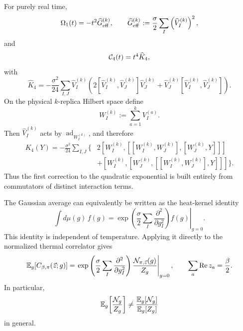 \documentclass{article}
\theoremstyle{definition}
\begin{document}
For purely real time,
\begin{equation}
    \Omega_1(t)=-t^2\widehat G_{\rm eff}^{(k)},
    \qquad
    \widehat G_{\rm eff}^{(k)}
    :=\frac{\sigma}{2}\sum_I\left(\widehat V_I^{(k)}\right)^2,
    \label{eq:quenched_Ghat_eff}
\end{equation}
and
\begin{equation}
    {\cal C}_4(t)=t^4\widehat K_4,
\end{equation}
with
\begin{equation}
    \widehat K_4
    =-\frac{\sigma^2}{24}\sum_{I,J}
    \widehat V_I^{(k)}\left(
        2[\widehat V_I^{(k)},\widehat V_J^{(k)}]\widehat V_J^{(k)}
        +\widehat V_J^{(k)}[\widehat V_I^{(k)},\widehat V_J^{(k)}]
    \right).
    \label{eq:quenched_K4_hatted}
\end{equation}
On the physical $k$-replica Hilbert space define
\begin{equation}
    W_I^{(k)}:=\sum_{a=1}^kV_I^{(a)}.
\end{equation}
Then $\widehat V_I^{(k)}$ acts by $\operatorname{ad}_{W_I^{(k)}}$, and therefore
\begin{align}
    K_4(Y)
    =-\frac{\sigma^2}{24}\sum_{I,J}\Big\{&
        2[W_I^{(k)},[[W_I^{(k)},W_J^{(k)}],[W_J^{(k)},Y]]]
    \nonumber\\
    &+[W_I^{(k)},[W_J^{(k)},[[W_I^{(k)},W_J^{(k)}],Y]]]
    \Big\}.
    \label{eq:quenched_K4_action}
\end{align}
Thus the first correction to the quadratic exponential is built entirely from commutators of distinct interaction terms.

The Gaussian average can equivalently be written as the heat-kernel identity
\begin{equation}
    \int d\mu(g)\,f(g)
    =\left.
    \exp\left(
        \frac{\sigma}{2}\sum_I\frac{\partial^2}{\partial g_I^2}
    \right)f(g)\right|_{g=0}.
    \label{eq:quenched_heat_kernel}
\end{equation}
This identity is independent of temperature. Applying it directly to the normalized thermal correlator gives
\begin{equation}
    \mathbb E_g\!\left[C_{\beta,\pi}(\vec z;g)\right]
    =\left.
    \exp\left(
        \frac{\sigma}{2}\sum_I\frac{\partial^2}{\partial g_I^2}
    \right)
    \frac{{\cal N}_{\pi,\vec z}(g)}{Z_g}
    \right|_{g=0},
    \qquad
    \sum_a\operatorname{Re}z_a=\frac{\beta}{2}.
    \label{eq:quenched_exact_thermal_average}
\end{equation}
In particular,
\begin{equation}
    \mathbb E_g\!\left[\frac{{\cal N}_g}{Z_g}\right]
    \neq
    \frac{\mathbb E_g[\mathcal N_g]}{\mathbb E_g[Z_g]}
\end{equation}
in general.
\end{document}
